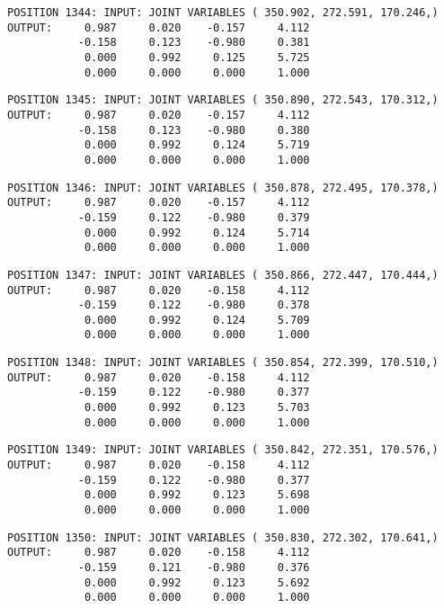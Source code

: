 \begin{verbatim}
POSITION 1344: INPUT: JOINT VARIABLES ( 350.902, 272.591, 170.246,)
OUTPUT:     0.987     0.020    -0.157     4.112
           -0.158     0.123    -0.980     0.381
            0.000     0.992     0.125     5.725
            0.000     0.000     0.000     1.000
\end{verbatim} \pagebreak[1]\begin{verbatim}
POSITION 1345: INPUT: JOINT VARIABLES ( 350.890, 272.543, 170.312,)
OUTPUT:     0.987     0.020    -0.157     4.112
           -0.158     0.123    -0.980     0.380
            0.000     0.992     0.124     5.719
            0.000     0.000     0.000     1.000
\end{verbatim} \pagebreak[1]\begin{verbatim}
POSITION 1346: INPUT: JOINT VARIABLES ( 350.878, 272.495, 170.378,)
OUTPUT:     0.987     0.020    -0.157     4.112
           -0.159     0.122    -0.980     0.379
            0.000     0.992     0.124     5.714
            0.000     0.000     0.000     1.000
\end{verbatim} \pagebreak[1]\begin{verbatim}
POSITION 1347: INPUT: JOINT VARIABLES ( 350.866, 272.447, 170.444,)
OUTPUT:     0.987     0.020    -0.158     4.112
           -0.159     0.122    -0.980     0.378
            0.000     0.992     0.124     5.709
            0.000     0.000     0.000     1.000
\end{verbatim} \pagebreak[1]\begin{verbatim}
POSITION 1348: INPUT: JOINT VARIABLES ( 350.854, 272.399, 170.510,)
OUTPUT:     0.987     0.020    -0.158     4.112
           -0.159     0.122    -0.980     0.377
            0.000     0.992     0.123     5.703
            0.000     0.000     0.000     1.000
\end{verbatim} \pagebreak[1]\begin{verbatim}
POSITION 1349: INPUT: JOINT VARIABLES ( 350.842, 272.351, 170.576,)
OUTPUT:     0.987     0.020    -0.158     4.112
           -0.159     0.122    -0.980     0.377
            0.000     0.992     0.123     5.698
            0.000     0.000     0.000     1.000
\end{verbatim} \pagebreak[1]\begin{verbatim}
POSITION 1350: INPUT: JOINT VARIABLES ( 350.830, 272.302, 170.641,)
OUTPUT:     0.987     0.020    -0.158     4.112
           -0.159     0.121    -0.980     0.376
            0.000     0.992     0.123     5.692
            0.000     0.000     0.000     1.000
\end{verbatim} \pagebreak[1]\begin{verbatim}

\end{verbatim}
